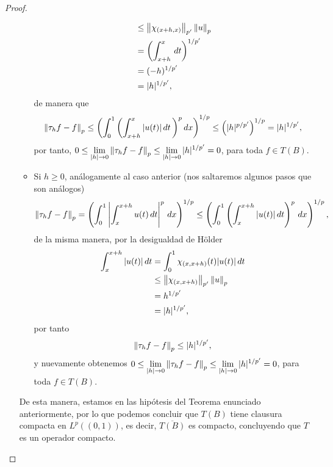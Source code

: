 \begin{proof}
\begin{enumerate}
\begin{itemize}
\begin{align*}
                &\leq \left\|\chi_{(x+h,x)}\right\|_{p'}\left\|u\right\|_p\\
                &=\left(\int_{x+h}^x \, dt\right)^{1/p'}\\
                &=(-h)^{1/p'}\\
                &=|h|^{1/p'},
            \end{align*}
            de manera que
            \begin{align*}
                \left\|\tau_hf-f\right\|_p\leq \left(\int_0^1\left(\int_{x+h}^x |u(t)|\, dt\, \right)^pdx\right)^{1/p}\leq \left(|h|^{p/p'}\right)^{1/p}=|h|^{1/p'},
            \end{align*}
            por tanto, $\displaystyle 0\leq \lim_{|h|\to 0}\left\|\tau_hf-f\right\|_p\leq \lim_{|h|\to 0}|h|^{1/p'}=0$, para toda $f \in T(B)$. 

            \item Si $h\geq 0$, análogamente al caso anterior (nos saltaremos algunos pasos que son análogos)
            \begin{align*}
                \left\|\tau_hf-f\right\|_p=\left(\int_0^1\left|\int_x^{x+h}u(t)\, dt\right|^p\, dx\right)^{1/p}\leq \left(\int_0^1\left(\int_{x}^{x+h}|u(t)|\, dt\right)^p\, dx\right)^{1/p},
            \end{align*}
            de la misma manera, por la desigualdad de Hölder
            \begin{align*}
                \int_{x}^{x+h}|u(t)|\, dt&=\int_0^1 \chi_{(x,x+h)}(t)|u(t)|\, dt\\
                &\leq \left\|\chi_{(x,x+h)}\right\|_{p'}\left\|u\right\|_p\\
                &=h^{1/p'}\\
                &=|h|^{1/p'},
            \end{align*}
            por tanto
            \begin{align*}
                \left\|\tau_hf-f\right\|_p\leq |h|^{1/p'},
            \end{align*}
            y nuevamente obtenemos $\displaystyle 0\leq \lim_{|h|\to 0}\left\|\tau_hf-f\right\|_p\leq \lim_{|h|\to 0}|h|^{1/p'}=0$, para toda $f \in T(B)$. 
        \end{itemize}
        De esta manera, estamos en las hipótesis del Teorema enunciado anteriormente, por lo que podemos concluir que $T(B)$ tiene clausura compacta en $L^p((0,1))$, es decir, $\overline{T(B)}$ es compacto, concluyendo que $T$ es un operador compacto.
        

\end{enumerate}
\end{proof}
